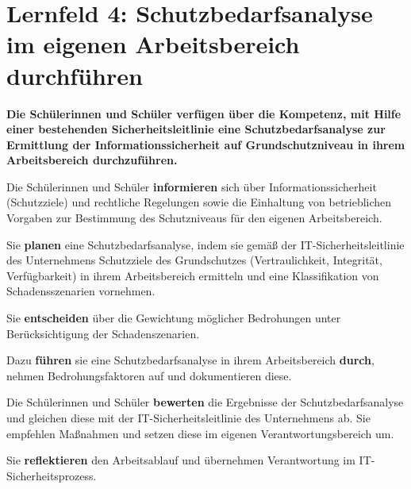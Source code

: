 \chapter{Lernfeld 4: Schutzbedarfsanalyse im eigenen Arbeitsbereich durchführen}

\textbf{Die Schülerinnen und Schüler verfügen über die Kompetenz, mit Hilfe einer bestehenden Sicherheitsleitlinie eine Schutzbedarfsanalyse zur Ermittlung der Informationssicherheit auf Grundschutzniveau in ihrem Arbeitsbereich durchzuführen.}

Die Schülerinnen und Schüler \textbf{informieren} sich über Informationssicherheit (Schutzziele)
und rechtliche Regelungen sowie die Einhaltung von betrieblichen Vorgaben zur Bestimmung des Schutzniveaus für den eigenen Arbeitsbereich.

Sie \textbf{planen} eine Schutzbedarfsanalyse, indem sie gemäß der IT-Sicherheitsleitlinie des Unternehmens Schutzziele des Grundschutzes (Vertraulichkeit, Integrität, Verfügbarkeit) in ihrem Arbeitsbereich ermitteln und eine Klassifikation von Schadensszenarien vornehmen.

Sie \textbf{entscheiden} über die Gewichtung möglicher Bedrohungen unter Berücksichtigung der
Schadenszenarien.

Dazu \textbf{führen} sie eine Schutzbedarfsanalyse in ihrem Arbeitsbereich \textbf{durch}, nehmen Bedrohungsfaktoren auf und dokumentieren diese.


Die Schülerinnen und Schüler \textbf{bewerten} die Ergebnisse der Schutzbedarfsanalyse und gleichen diese mit der IT-Sicherheitsleitlinie des Unternehmens ab. Sie empfehlen Maßnahmen
und setzen diese im eigenen Verantwortungsbereich um.

Sie \textbf{reflektieren} den Arbeitsablauf und übernehmen Verantwortung im IT-Sicherheitsprozess.









